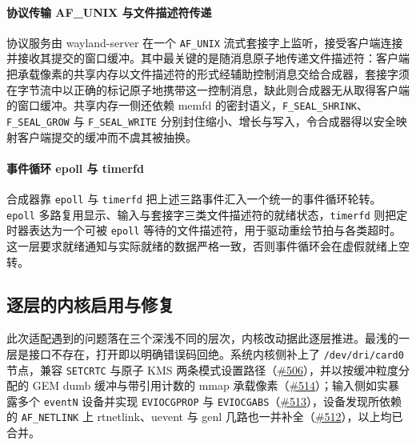\paragraph{协议传输 AF\_UNIX 与文件描述符传递}
协议服务由 wayland-server 在一个 \texttt{AF\_UNIX} 流式套接字上监听，接受客户端连接并接收其提交的窗口缓冲。其中最关键的是随消息原子地传递文件描述符：客户端把承载像素的共享内存以文件描述符的形式经辅助控制消息交给合成器，套接字须在字节流中以正确的标记原子地携带这一控制消息，缺此则合成器无从取得客户端的窗口缓冲。共享内存一侧还依赖 memfd 的密封语义，\texttt{F\_SEAL\_SHRINK}、\texttt{F\_SEAL\_GROW} 与 \texttt{F\_SEAL\_WRITE} 分别封住缩小、增长与写入，令合成器得以安全映射客户端提交的缓冲而不虞其被抽换。

\paragraph{事件循环 epoll 与 timerfd}
合成器靠 \texttt{epoll} 与 \texttt{timerfd} 把上述三路事件汇入一个统一的事件循环轮转。\texttt{epoll} 多路复用显示、输入与套接字三类文件描述符的就绪状态，\texttt{timerfd} 则把定时器表达为一个可被 \texttt{epoll} 等待的文件描述符，用于驱动重绘节拍与各类超时。这一层要求就绪通知与实际就绪的数据严格一致，否则事件循环会在虚假就绪上空转。

\subsection{逐层的内核启用与修复}

此次适配遇到的问题落在三个深浅不同的层次，内核改动据此逐层推进。最浅的一层是接口不存在，打开即以明确错误码回绝。系统内核侧补上了 \texttt{/dev/dri/card0} 节点，兼容 \texttt{SETCRTC} 与原子 KMS 两条模式设置路径（\href{https://github.com/rcore-os/tgoskits/pull/506}{\#506}），并以按缓冲粒度分配的 GEM dumb 缓冲与带引用计数的 mmap 承载像素（\href{https://github.com/rcore-os/tgoskits/pull/514}{\#514}）；输入侧如实暴露多个 \texttt{eventN} 设备并实现 \texttt{EVIOCGPROP} 与 \texttt{EVIOCGABS}（\href{https://github.com/rcore-os/tgoskits/pull/513}{\#513}），设备发现所依赖的 \texttt{AF\_NETLINK} 上 rtnetlink、uevent 与 genl 几路也一并补全（\href{https://github.com/rcore-os/tgoskits/pull/512}{\#512}），以上均已合并。

